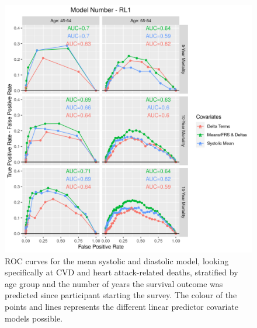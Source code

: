 \documentclass[
]{article}
\begin{document}
\begin{figure}
\hypertarget{fig:ROC_RL1}{%
\centering
\includegraphics{./Rmarkdown_Plots/ROC_CAx-Covariates_EventType_RL1.png}
\caption{ROC curves for the mean systolic and diastolic model, looking specifically at CVD and heart attack-related deaths, stratified by age group and the number of years the survival outcome was predicted since participant starting the survey. The colour of the points and lines represents the different linear predictor covariate models possible.}\label{fig:ROC_RL1}
}
\end{figure}
\end{document}
